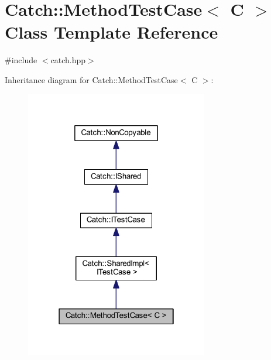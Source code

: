 \hypertarget{class_catch_1_1_method_test_case}{}\section{Catch\+:\+:Method\+Test\+Case$<$ C $>$ Class Template Reference}
\label{class_catch_1_1_method_test_case}


{\ttfamily \#include $<$catch.\+hpp$>$}



Inheritance diagram for Catch\+:\+:Method\+Test\+Case$<$ C $>$\+:\nopagebreak
\begin{figure}[H]
\begin{center}
\leavevmode
\includegraphics[width=226pt]{class_catch_1_1_method_test_case__inherit__graph}
\end{center}
\end{figure}


